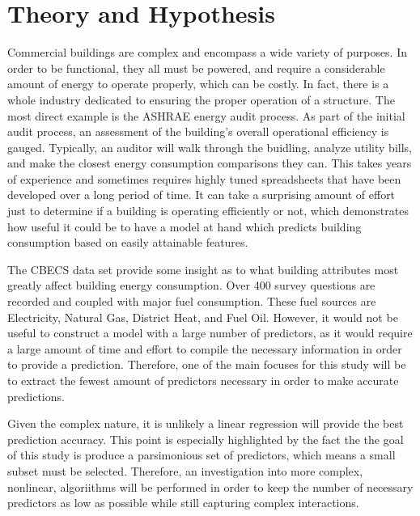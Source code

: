 \section{Theory and Hypothesis}
\label{sec:theory_and_hypothesis}

Commercial buildings are complex and encompass a wide variety of purposes. In order to be functional, they all must be powered, and require a considerable amount of energy to operate properly, which can be costly.  In fact, there is a whole industry dedicated to ensuring the proper operation of a structure.  The most direct example is the ASHRAE energy audit process.  As part of the initial audit process, an assessment of the building's overall operational efficiency is gauged.  Typically, an auditor will walk through the buidling, analyze utility bills, and make the closest energy consumption comparisons they can.  This takes years of experience and sometimes requires highly tuned spreadsheets that have been developed over a long period of time.  It can take a surprising amount of effort just to determine if a building is operating efficiently or not, which demonstrates how useful it could be to have a model at hand which predicts building consumption based on easily attainable features.

The CBECS data set provide some insight as to what building attributes most greatly affect building energy consumption.  Over 400 survey questions are recorded and coupled with major fuel consumption.  These fuel sources are Electricity, Natural Gas, District Heat, and Fuel Oil.  However, it would not be useful to construct a model with a large number of predictors, as it would require a large amount of time and effort to compile the necessary information in order to provide a prediction.  Therefore, one of the main focuses for this study will be to extract the fewest amount of predictors necessary in order to make accurate predictions.  

Given the complex nature, it is unlikely a linear regression will provide the best prediction accuracy.  This point is especially highlighted by the fact the the goal of this study is produce a parsimonious set of predictors, which means a small subset must be selected.  Therefore, an investigation into more complex, nonlinear, algoriithms will be performed in order to keep the number of necessary predictors as low as possible while still capturing complex interactions.